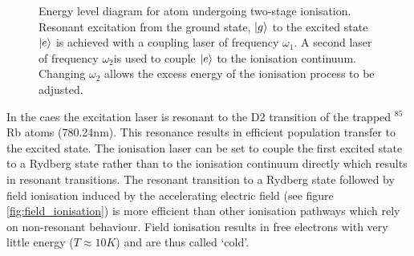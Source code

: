 \begin{figure}
\centering
{}
\caption[Title]{Energy level diagram for atom undergoing two-stage ionisation. Resonant excitation from the ground state, $\ket{g}$ to the excited state $\ket{e}$ is achieved with a coupling laser of frequency $\omega_1$. A second laser of frequency $\omega_2$is used to couple $\ket{e}$ to the ionisation continuum. Changing $\omega_2$ allows the excess energy of the ionisation process to be adjusted.}
\label{fig:energy_level}
\end{figure}

In the \gls{caes} the excitation laser is resonant to the D2 transition of the trapped $^{85}$Rb atoms (780.24nm). This resonance results in efficient population transfer to the excited state. The ionisation laser can be set to couple the first excited state to a Rydberg state rather than to the ionisation continuum directly which results in resonant transitions. The resonant transition to a Rydberg state followed by field ionisation induced by the accelerating electric field (see figure \ref{fig:field_ionisation}) is more efficient than other ionisation pathways which rely on non-resonant behaviour. Field ionisation results in free electrons with very little energy ($T\approx10K$\cite{mcculloch_arbitrarily_2011}) and are thus called `cold'.

